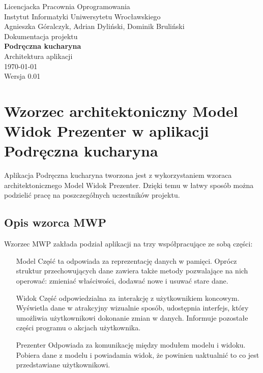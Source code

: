 \documentclass[12pt,leqno, twoside]{mwart}
\begin{document}
\thispagestyle{empty}
\begin{center}
Licencjacka Pracownia Oprogramowania \\ Instytut
Informatyki Uniwersytetu Wrocławskiego \\
\vspace{4cm}
\Large Agnieszka Góralczyk, Adrian Dyliński, Dominik Bruliński \\
\vspace{0.5cm}
\huge Dokumentacja projektu\\ \textbf{Podręczna kucharyna}\\ \Large Architektura aplikacji\\
\vspace{1cm}
\normalsize \today \\
\vspace{2cm}
\normalsize Wersja 0.01
\end{center}

\newpage
\section{Wzorzec architektoniczny Model Widok Prezenter w aplikacji Podręczna kucharyna}
Aplikacja Podręczna kucharyna tworzona jest z wykorzystaniem wzoraca architektonicznego Model Widok Prezenter.
Dzięki temu w łatwy sposób można podzielić pracę na poszczegółnych uczestników projektu. 
\subsection{Opis wzorca MWP}
Wzorzec MWP zakłada podział aplikacji na trzy współpracujące ze sobą części:
\begin{itemize}
\item[Model] Część ta odpowiada za reprezentację danych w pamięci. Oprócz struktur przechowujących dane zawiera także metody pozwalające na nich operować: zmieniać właściwości, dodawać nowe i usuwać stare dane.
\item[Widok] Część odpowiedzialna za interakcję z użytkownikiem koncowym. Wyświetla dane w atrakcyjny wizualnie sposób, udostępnia interfejs, który umożliwia użytkownikowi dokonanie zmian w danych. Informuje pozostałe części programu o akcjach użytkownika.
\item[Prezenter] Odpowiada za komunikację między modułem modelu i widoku. Pobiera dane z modelu i powiadamia widok, że powinien uaktualnić to co jest przedstawiane użytkownikowi.
\end{itemize}
\end{document}
